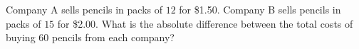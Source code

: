 Company A sells pencils in packs of $12$ for \$1.50. Company B sells pencils in packs of $15$ for \$2.00. What is the absolute difference between the total costs of buying $60$ pencils from each company?
